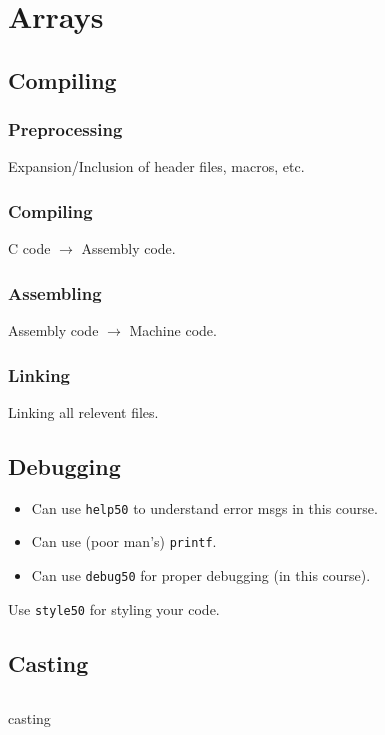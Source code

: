 \chapter{Arrays}
\section{Compiling}
\subsection{Preprocessing}
Expansion/Inclusion of header files, macros, etc.

\subsection{Compiling}
C code $\to$ Assembly code.

\subsection{Assembling}
Assembly code $\to$ Machine code.

\subsection{Linking}
Linking all relevent files.

\section{Debugging}
\begin{itemize}
    \item Can use \texttt{help50} to understand error msgs in this course.
    \item Can use (poor man's) \texttt{printf}.
    \item Can use \texttt{debug50} for proper debugging (in this course).
\end{itemize}

\begin{remark}
    Use \texttt{style50} for styling your code.
\end{remark}

\section{Casting}
\begin{code}[ht!]
    \inputminted[linenos]{c}{codes/src2/hi.c}
    \caption{casting}
\end{code}

